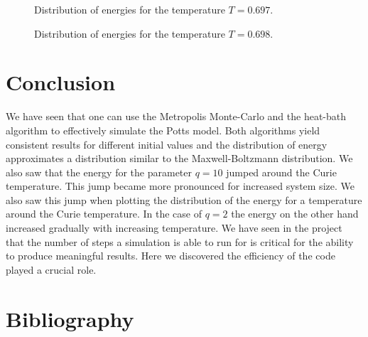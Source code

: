 \begin{figure}
\centering
\begin{minipage}[b]{0.45\textwidth}
\centering
\graphicspath{{../../Plots/}}

\caption{Distribution of energies for the temperature  $T=0.697$.}
\label{fi:T0697}
\end{minipage}
\hfill
\begin{minipage}[b]{0.45\textwidth}
\centering
\graphicspath{{../../Plots/}}

\caption{Distribution of energies for the temperature  $T=0.698$.}
\label{fi:T0698}
\end{minipage}
\end{figure}

\section{Conclusion}


We have seen that one can use the Metropolis Monte-Carlo and the heat-bath algorithm to effectively simulate the Potts model. Both algorithms yield consistent results for different initial values and 
the distribution of energy approximates a distribution similar to the Maxwell-Boltzmann distribution. 
We also saw that the energy for the parameter $q=10$ jumped around the Curie temperature. This jump became more pronounced for increased system size. We also saw this jump when plotting the distribution of the energy for a temperature around the Curie temperature. In the case of $q=2$ the energy on the other hand increased gradually with increasing temperature.
We have seen in the project that the number of steps a simulation is able to run for is critical for the ability to produce meaningful results. Here we discovered the efficiency of the code played a crucial role.

\newpage
\section*{Bibliography}
\nocite{*}
\printbibliography[heading=none, keyword={secondary}]



